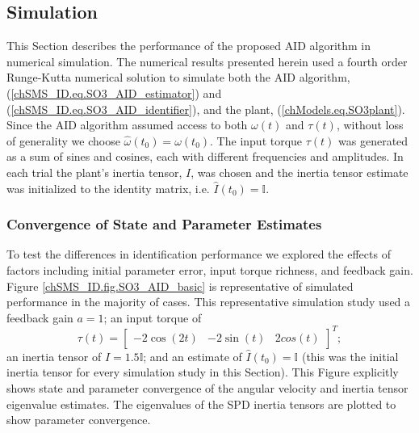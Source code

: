 \subsection{Simulation}\label{chSMS_ID.sec.SO3_AID_Sim}

This Section describes the performance of the proposed \ac{AID}
algorithm in numerical simulation.  The numerical results presented
herein used a fourth order Runge-Kutta numerical solution to simulate
both the \ac{AID} algorithm, (\ref{chSMS_ID.eq.SO3_AID_estimator})
and (\ref{chSMS_ID.eq.SO3_AID_identifier}), and the plant,
(\ref{chModels.eq.SO3plant}).  Since the \ac{AID} algorithm assumed
access to both $\omega(t)$ and $\tau(t)$, without loss of generality we
choose $\hat{\omega}(t_0)=\omega(t_0)$. The input torque $\tau(t)$ was
generated as a sum of sines and cosines, each with different
frequencies and amplitudes.  In each trial the plant's inertia tensor,
$I$, was chosen and the inertia tensor estimate was initialized to the
identity matrix, i.e. $\hat{I}(t_0)=\mathbb{I}$.


\subsubsection{Convergence of State and Parameter Estimates}

To test the differences in identification performance we explored the
effects of factors including initial parameter error, input torque
richness, and feedback gain.  Figure \ref{chSMS_ID.fig.SO3_AID_basic} is
representative of simulated performance in the majority of cases.
This representative simulation study used a
feedback gain $a=1$; an input torque of
%
\begin{equation}
\tau(t)=\left[ \begin{array}{ccc}-2\cos(2t)& -2\sin(t)
    &2cos(t)\end{array}\right]^{T};
\end{equation}
%
an inertia tensor of $I=1.5\mathbb{I}$; and an estimate of
$\hat{I}(t_0)=\mathbb{I}$ (this was the initial inertia tensor for
every simulation study in this Section).  This Figure explicitly shows
state and parameter convergence of the angular velocity and inertia
tensor eigenvalue estimates.  The eigenvalues of the \ac{SPD} inertia
tensors are plotted to show parameter convergence.

